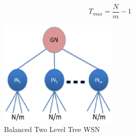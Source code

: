 \begin{equation}
T_{max} = {\frac{N}{m}-1}
\end{equation}

\begin{figure}[t] %
  \begin{center}
    \leavevmode  
      \includegraphics[height=2in]{5.eps}
     \caption{Balanced Two Level Tree WSN}     
    \label{bal}
  \end{center}
\end{figure}


